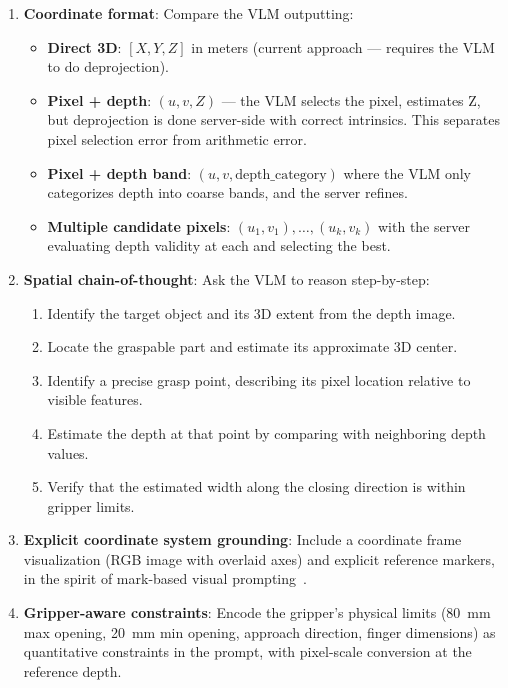 \documentclass[11pt,a4paper]{article}
\begin{document}
\begin{enumerate}[label=\textbf{P\arabic*:}, leftmargin=*]
    \item \textbf{Coordinate format}: Compare the VLM outputting:
    \begin{itemize}[nosep]
        \item \textbf{Direct 3D}: $[X, Y, Z]$ in meters (current approach --- requires the VLM to do deprojection).
        \item \textbf{Pixel + depth}: $(u, v, Z)$ --- the VLM selects the pixel, estimates Z, but deprojection is done server-side with correct intrinsics. This separates pixel selection error from arithmetic error.
        \item \textbf{Pixel + depth band}: $(u, v, \text{depth\_category})$ where the VLM only categorizes depth into coarse bands, and the server refines.
        \item \textbf{Multiple candidate pixels}: $(u_1, v_1), \ldots, (u_k, v_k)$ with the server evaluating depth validity at each and selecting the best.
    \end{itemize}

    \item \textbf{Spatial chain-of-thought}: Ask the VLM to reason step-by-step:
    \begin{enumerate}[nosep]
        \item Identify the target object and its 3D extent from the depth image.
        \item Locate the graspable part and estimate its approximate 3D center.
        \item Identify a precise grasp point, describing its pixel location relative to visible features.
        \item Estimate the depth at that point by comparing with neighboring depth values.
        \item Verify that the estimated width along the closing direction is within gripper limits.
    \end{enumerate}

    \item \textbf{Explicit coordinate system grounding}: Include a coordinate frame visualization (RGB image with overlaid axes) and explicit reference markers, in the spirit of mark-based visual prompting~\cite{liu2024moka}.

    \item \textbf{Gripper-aware constraints}: Encode the gripper's physical limits (80~mm max opening, 20~mm min opening, approach direction, finger dimensions) as quantitative constraints in the prompt, with pixel-scale conversion at the reference depth.


\end{enumerate}
\end{document}
